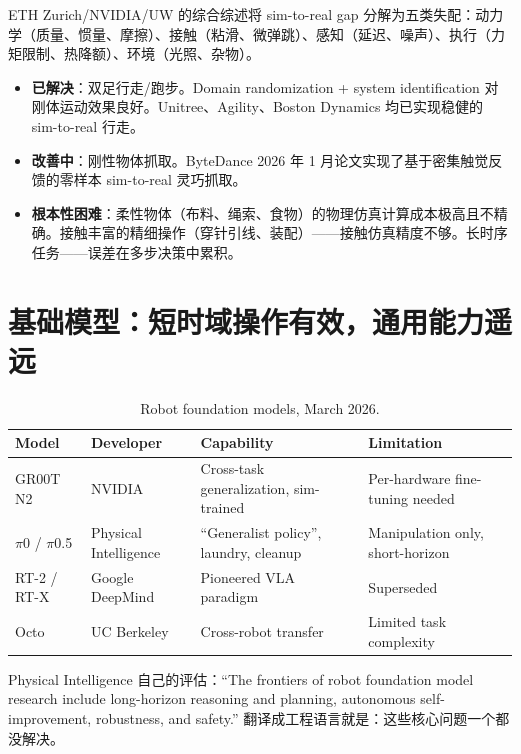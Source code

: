 ETH Zurich/NVIDIA/UW 的综合综述\cite{aljalbout2026realitygap}将 sim-to-real gap 分解为五类失配：动力学（质量、惯量、摩擦）、接触（粘滑、微弹跳）、感知（延迟、噪声）、执行（力矩限制、热降额）、环境（光照、杂物）。

\begin{keybox}
\begin{itemize}
  \item \textbf{已解决}：双足行走/跑步。Domain randomization + system identification 对刚体运动效果良好。Unitree、Agility、Boston Dynamics 均已实现稳健的 sim-to-real 行走\cite{aljalbout2026realitygap}。
  \item \textbf{改善中}：刚性物体抓取。ByteDance 2026 年 1 月论文实现了基于密集触觉反馈的零样本 sim-to-real 灵巧抓取\cite{bytedance2026simtoreal}。
  \item \textbf{根本性困难}：柔性物体（布料、绳索、食物）的物理仿真计算成本极高且不精确。接触丰富的精细操作（穿针引线、装配）——接触仿真精度不够。长时序任务——误差在多步决策中累积。
\end{itemize}
\end{keybox}

\section{基础模型：短时域操作有效，通用能力遥远}

\begin{table}[htbp]
\centering
\caption{Robot foundation models, March 2026.}
\label{tab:foundation}
\begin{tabularx}{\textwidth}{llXl}
\toprule
\rowcolor{figLightGray}
\textbf{Model} & \textbf{Developer} & \textbf{Capability} & \textbf{Limitation} \\
\midrule
GR00T N2 & NVIDIA & Cross-task generalization, sim-trained & Per-hardware fine-tuning needed \\
$\pi$0 / $\pi$0.5 & Physical Intelligence & ``Generalist policy'', laundry, cleanup & Manipulation only, short-horizon \\
RT-2 / RT-X & Google DeepMind & Pioneered VLA paradigm & Superseded \\
Octo & UC Berkeley & Cross-robot transfer & Limited task complexity \\
\bottomrule
\end{tabularx}
\end{table}

Physical Intelligence 自己的评估\cite{pi2024frontier}：``The frontiers of robot foundation model research include long-horizon reasoning and planning, autonomous self-improvement, robustness, and safety.'' 翻译成工程语言就是：这些核心问题一个都没解决。

